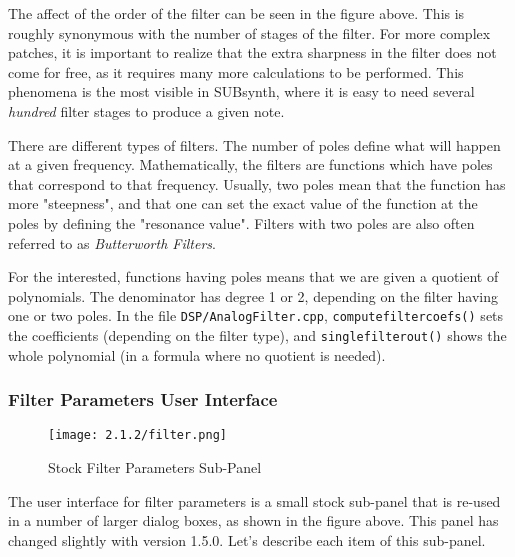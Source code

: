    The affect of the order of the filter can be seen in the figure above.
   This is roughly synonymous with the number of stages of the filter. For
   more complex patches, it is important to realize that the extra sharpness
   in the filter does not come for free, as it requires many more
   calculations to be performed. This phenomena is the most visible in
   SUBsynth, where it is easy to need several \textsl{hundred} filter stages
   to produce a given note.

   There are different types of filters. The number of poles define what will
   happen at a given frequency. Mathematically, the filters are functions which
   have poles that correspond to that frequency. Usually, two poles mean that
   the function has more "steepness", and that one can set the exact value of
   the function at the poles by defining the "resonance value". Filters with
   two poles are also often referred to as \textsl{Butterworth Filters}.

   For the interested, functions having poles means that we are given a
   quotient of polynomials. The denominator has degree 1 or 2, depending on the
   filter having one or two poles. In the file \texttt{DSP/AnalogFilter.cpp},
   \texttt{computefiltercoefs()} sets the coefficients
   (depending on the filter type), and
   \texttt{singlefilterout()} shows
   the whole polynomial (in a formula where no quotient is needed).

\subsubsection{Filter Parameters User Interface}
\label{subsubsec:filter_parameters_user_interface}

\begin{figure}[H]
   \centering
   \texttt{[image: 2.1.2/filter.png]}
   \caption[Filter Parameters Sub-panel]{Stock Filter Parameters Sub-Panel}
   \label{fig:filter_parameters_subpanel}
\end{figure}

   The user interface for filter parameters is a small stock sub-panel that
   is re-used in a number of larger dialog boxes, as shown in the figure
   above.  This panel has changed slightly with version 1.5.0.
   Let's describe each item of this sub-panel.


